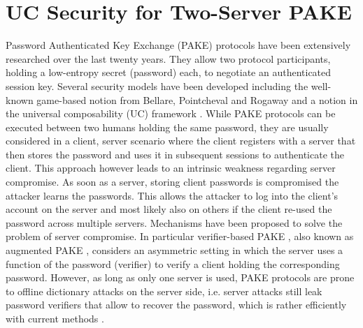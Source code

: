 \section{UC Security for Two-Server PAKE}
Password Authenticated Key Exchange (PAKE) protocols have been extensively researched over the last twenty years.
They allow two protocol participants, holding a low-entropy secret (password) each, to negotiate an authenticated session key.
Several security models have been developed including the well-known game-based notion from Bellare, Pointcheval and Rogaway \cite{Bellare2000,Abdalla2005a} and a notion in the universal composability (UC) framework \cite{Canetti2005}.
While PAKE protocols can be executed between two humans holding the same password, they are usually considered in a client, server scenario where the client registers with a server that then stores the password and uses it in subsequent sessions to authenticate the client.
This approach however leads to an intrinsic weakness regarding server compromise.
As soon as a server, storing client passwords is compromised the attacker learns the passwords.
This allows the attacker to log into the client's account on the server and most likely also on others if the client re-used the password across multiple servers.
Mechanisms have been proposed to solve the problem of server compromise.
In particular verifier-based PAKE \cite{Gentry2006,rfc2945,BenhamoudaP13}, also known as augmented PAKE \cite{BellovinM93}, considers an asymmetric setting in which the server uses a function of the password (verifier) to verify a client holding the corresponding password.
However, as long as only one server is used, PAKE protocols are prone to offline dictionary attacks on the server side, i.e. server attacks still leak password verifiers that allow to recover the password, which is rather efficiently with current methods \cite{hashcat,JohnTheRipper}.

